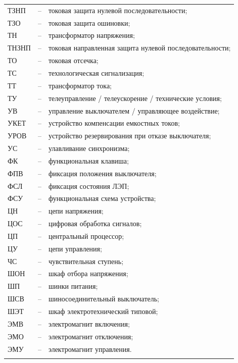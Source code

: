 \begin{longtable}{>{\raggedright\arraybackslash}m{2cm}>{\raggedright\arraybackslash}m{0.5cm}>{\raggedright\arraybackslash}m{20cm}}
ТЗНП & -- & токовая защита нулевой последовательности; \\
ТЗО & -- & токовая защита ошиновки; \\
ТН & -- & трансформатор напряжения; \\
ТНЗНП & -- & токовая направленная защита нулевой последовательности; \\
ТО & -- & токовая отсечка; \\
ТС & -- & технологическая сигнализация; \\
ТТ & -- & трансформатор тока; \\
ТУ & -- & телеуправление / телеускорение / технические условия; \\
УВ & -- & управление выключателем / управляющее воздействие; \\
УКЕТ & -- & устройство компенсации емкостных токов; \\
УРОВ & -- & устройство резервирования при отказе выключателя; \\
УС & -- & улавливание синхронизма; \\
ФК & -- & функциональная клавиша; \\
ФПВ & -- & фиксация положения выключателя; \\
ФСЛ & -- & фиксация состояния ЛЭП; \\
ФСУ & -- & функциональная схема устройства; \\
ЦН & -- & цепи напряжения; \\
ЦОС & -- & цифровая обработка сигналов; \\
ЦП & -- & центральный процессор; \\
ЦУ & -- & цепи управления; \\
ЧС & -- & чувствительная ступень; \\
ШОН & -- & шкаф отбора напряжения; \\
ШП & -- & шинки питания; \\
ШСВ & -- & шиносоединительный выключатель; \\
ШЭТ & -- & шкаф электротехнический типовой; \\
ЭМВ & -- & электромагнит включения; \\
ЭМО & -- & электромагнит отключения; \\
ЭМУ & -- & электромагнит управления. \\
{\color{white}\fontsize{0.1pt}{0.1pt}\selectfont<endABBRS>}
\end{longtable}
